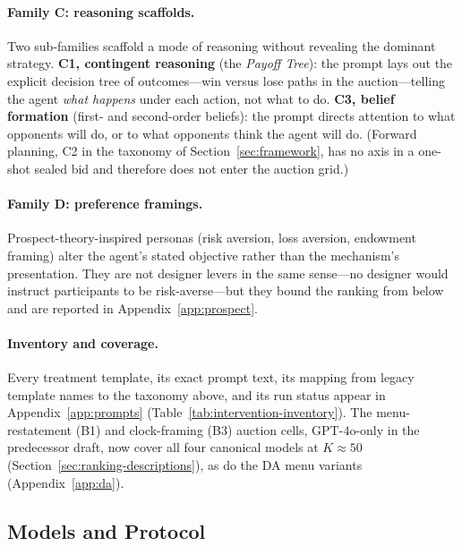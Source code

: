 \paragraph{Family C: reasoning scaffolds.}
Two sub-families scaffold a mode of reasoning without revealing the dominant
strategy. \textbf{C1, contingent reasoning} (the \emph{Payoff Tree}): the
prompt lays out the explicit decision tree of outcomes---win versus lose paths
in the auction---telling the agent \emph{what happens} under each action, not
what to do. \textbf{C3, belief formation} (first- and second-order beliefs): the
prompt directs attention to what opponents will do, or to what opponents think
the agent will do. (Forward planning, C2 in the taxonomy of
Section~\ref{sec:framework}, has no axis in a one-shot sealed bid and therefore
does not enter the auction grid.)

\paragraph{Family D: preference framings.}
Prospect-theory-inspired personas (risk aversion, loss aversion, endowment
framing) alter the agent's stated objective rather than the mechanism's
presentation. They are not designer levers in the same sense---no designer
would instruct participants to be risk-averse---but they bound the ranking from
below and are reported in Appendix~\ref{app:prospect}.

\paragraph{Inventory and coverage.}
Every treatment template, its exact prompt text, its mapping from legacy
template names to the taxonomy above, and its run status appear in
Appendix~\ref{app:prompts} (Table~\ref{tab:intervention-inventory}). The
menu-restatement (B1) and clock-framing (B3) auction cells, GPT-4o-only in the
predecessor draft, now cover all four canonical models at $K \approx 50$
(Section~\ref{sec:ranking-descriptions}), as do the DA menu variants
(Appendix~\ref{app:da}).

\subsection{Models and Protocol}\label{sec:design-models}

